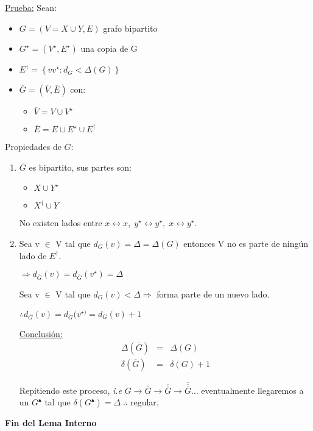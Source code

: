 \documentclass[12pt,a4paper]{report}
\begin{document}
				\underline{Prueba:} Sean:
					\begin{itemize}
						\item $G = (V = X \cup Y, E)$ grafo bipartito
						\item $G^{\star} = (V^{\star}, E^{\star})$ una copia de G
						\item $E^{\dag} = \left\lbrace vv^{\star} : d_{G} < \Delta(G) \right\rbrace$
						\item $\overline{G} = (\overline{V}, \overline{E})$ con:
							\begin{itemize}
								\item $\overline{V} = V \cup V^{\star}$
								\item $\overline{E} = E \cup E^{\star} \cup E^{\dag}$
							\end{itemize}
					\end{itemize}

					\par Propiedades de $\overline{G}$:
					\begin{enumerate}
						\item $\overline{G}$ es bipartito, sus partes son:
							\begin{itemize}
								\item $X \cup Y^{\star}$
								\item $X^{\dag} \cup Y$
							\end{itemize}
							\par No existen lados entre $x \leftrightarrow x, \; y^{\star} \leftrightarrow y^{\star}, \; x \leftrightarrow y^{\star}$.

						\item Sea v $\in$ V tal que $d_{G}(v) = \Delta = \Delta(G)$ entonces V no es parte de ningún lado de $E^{\dag}$.
							\par $\Rightarrow d_{\overline{G}}(v) = d_{\overline{G}}(v^{\star}) = \Delta$

							\vspace{5mm}
							\par Sea v $\in$ V tal que $d_{G}(v) < \Delta \Rightarrow$ forma parte de un nuevo lado.
							\par $\therefore d_{\overline{G}}(v) = d_{\overline{G}}(v^{\star)} = d_{G}(v) + 1$

							\vspace{5mm}
							\par \underline{Conclusión:}
							\begin{eqnarray}
								\nonumber \Delta(\overline{G}) &=& \Delta(G) \\
								\nonumber \delta(\overline{G}) &=& \delta(G) + 1
							\end{eqnarray}
							\par Repitiendo este proceso, \textit{i.e} $G \rightarrow \overline{G} \rightarrow \overline{\overline{G}} \rightarrow \overline{\overline{\overline{G}}} \dotsc $ eventualmente llegaremos a un $G^{\blacktriangle}$ tal que $\delta(G^{\blacktriangle}) = \Delta \; \therefore $ regular.
					\end{enumerate}
			\textbf{Fin del Lema Interno}
\end{document}
